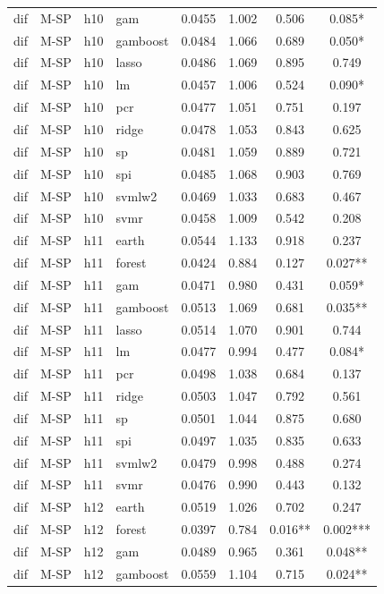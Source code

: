 \begin{ThreePartTable}
\begin{longtable}[t]{llclcccc}
dif & M-SP & h10 & gam & 0.0455 & 1.002 & 0.506 & 0.085*\\
dif & M-SP & h10 & gamboost & 0.0484 & 1.066 & 0.689 & 0.050*\\
dif & M-SP & h10 & lasso & 0.0486 & 1.069 & 0.895 & 0.749\\
dif & M-SP & h10 & lm & 0.0457 & 1.006 & 0.524 & 0.090*\\
dif & M-SP & h10 & pcr & 0.0477 & 1.051 & 0.751 & 0.197\\
dif & M-SP & h10 & ridge & 0.0478 & 1.053 & 0.843 & 0.625\\
dif & M-SP & h10 & sp & 0.0481 & 1.059 & 0.889 & 0.721\\
dif & M-SP & h10 & spi & 0.0485 & 1.068 & 0.903 & 0.769\\
dif & M-SP & h10 & svmlw2 & 0.0469 & 1.033 & 0.683 & 0.467\\
dif & M-SP & h10 & svmr & 0.0458 & 1.009 & 0.542 & 0.208\\
\addlinespace
dif & M-SP & h11 & earth & 0.0544 & 1.133 & 0.918 & 0.237\\
dif & M-SP & h11 & forest & 0.0424 & 0.884 & 0.127 & 0.027**\\
dif & M-SP & h11 & gam & 0.0471 & 0.980 & 0.431 & 0.059*\\
dif & M-SP & h11 & gamboost & 0.0513 & 1.069 & 0.681 & 0.035**\\
dif & M-SP & h11 & lasso & 0.0514 & 1.070 & 0.901 & 0.744\\
dif & M-SP & h11 & lm & 0.0477 & 0.994 & 0.477 & 0.084*\\
dif & M-SP & h11 & pcr & 0.0498 & 1.038 & 0.684 & 0.137\\
dif & M-SP & h11 & ridge & 0.0503 & 1.047 & 0.792 & 0.561\\
dif & M-SP & h11 & sp & 0.0501 & 1.044 & 0.875 & 0.680\\
dif & M-SP & h11 & spi & 0.0497 & 1.035 & 0.835 & 0.633\\
dif & M-SP & h11 & svmlw2 & 0.0479 & 0.998 & 0.488 & 0.274\\
dif & M-SP & h11 & svmr & 0.0476 & 0.990 & 0.443 & 0.132\\
\addlinespace
dif & M-SP & h12 & earth & 0.0519 & 1.026 & 0.702 & 0.247\\
dif & M-SP & h12 & forest & 0.0397 & 0.784 & 0.016** & 0.002***\\
dif & M-SP & h12 & gam & 0.0489 & 0.965 & 0.361 & 0.048**\\
dif & M-SP & h12 & gamboost & 0.0559 & 1.104 & 0.715 & 0.024**\\

\end{longtable}
\end{ThreePartTable}
